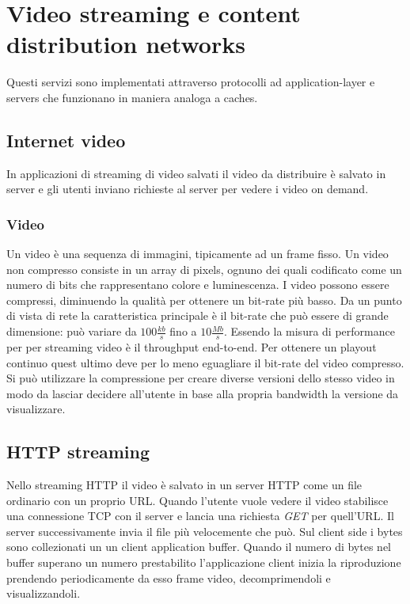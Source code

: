 \section{Video streaming e content distribution networks}
Questi servizi sono implementati attraverso protocolli ad application-layer e servers che funzionano in maniera analoga a caches.
\subsection{Internet video}
In applicazioni di streaming di video salvati il video da distribuire \`e salvato in server e gli utenti inviano richieste al server per vedere i video on
demand. 
\subsubsection{Video}
Un video \`e una sequenza di immagini, tipicamente ad un frame fisso. Un video non compresso consiste in un array di pixels, ognuno dei quali codificato 
come un numero di bits che rappresentano colore e luminescenza. I video possono essere compressi, diminuendo la qualit\`a per ottenere un bit-rate pi\`u 
basso. Da un punto di vista di rete la caratteristica principale \`e il bit-rate che pu\`o essere di grande dimensione: pu\`o variare da $100\frac{kb}{s}$
fino a $10\frac{Mb}{s}$. Essendo la misura di performance per per streaming video \`e il throughput end-to-end. Per ottenere un playout continuo quest 
ultimo deve per lo meno eguagliare il bit-rate del video compresso. Si pu\`o utilizzare la compressione per creare diverse versioni dello stesso video in
modo da lasciar decidere all'utente in base alla propria bandwidth la versione da visualizzare. 
\subsection{HTTP streaming}
Nello streaming HTTP il video \`e salvato in un server HTTP come un file ordinario con un proprio URL. Quando l'utente vuole vedere il video stabilisce una
connessione TCP con il server e lancia una richiesta \emph{GET} per quell'URL. Il server successivamente invia il file pi\`u velocemente che pu\`o. Sul 
client side i bytes sono collezionati un un client application buffer. Quando il numero di bytes nel buffer superano un numero prestabilito l'applicazione
client inizia la riproduzione prendendo periodicamente da esso frame video, decomprimendoli e visualizzandoli. 
